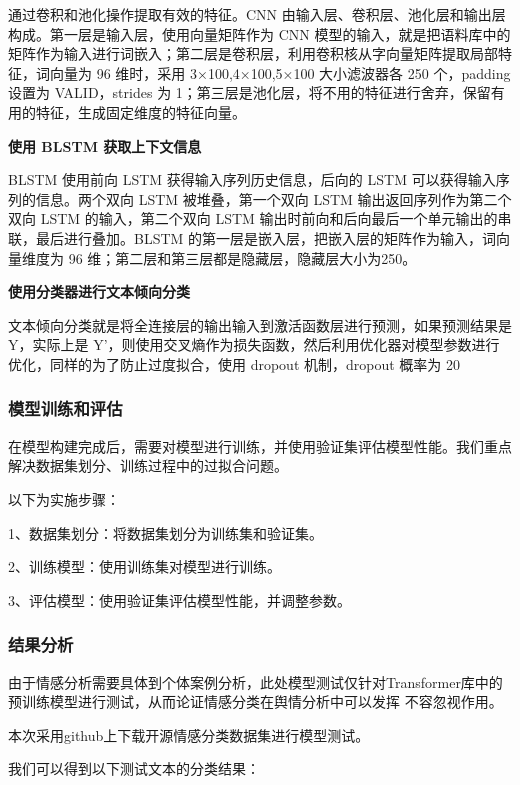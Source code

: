 \documentclass[UTF8,a4paper,15pt,titlepage,oneside]{ctexbook}
\begin{document}
通过卷积和池化操作提取有效的特征。CNN 由输入层、卷积层、池化层和输出层构成。第一层是输入层，使用向量矩阵作为 CNN 模型的输入，就是把语料库中的矩阵作为输入进行词嵌入；第二层是卷积层，利用卷积核从字向量矩阵提取局部特征，词向量为 96 维时，采用 3×100,4×100,5×100 大小滤波器各 250 个，padding 设置为 VALID，strides 为 1；第三层是池化层，将不用的特征进行舍弃，保留有用的特征，生成固定维度的特征向量。

\vskip 0.2cm
\noindent
\textbf{使用 BLSTM 获取上下文信息}

BLSTM 使用前向 LSTM 获得输入序列历史信息，后向的 LSTM 可以获得输入序列的信息。两个双向 LSTM 被堆叠，第一个双向 LSTM 输出返回序列作为第二个双向 LSTM 的输入，第二个双向 LSTM 输出时前向和后向最后一个单元输出的串联，最后进行叠加。BLSTM 的第一层是嵌入层，把嵌入层的矩阵作为输入，词向量维度为 96 维；第二层和第三层都是隐藏层，隐藏层大小为250。

\vskip 0.2cm
\noindent
\textbf{使用分类器进行文本倾向分类}

文本倾向分类就是将全连接层的输出输入到激活函数层进行预测，如果预测结果是 Y，实际上是 Y’，则使用交叉熵作为损失函数，然后利用优化器对模型参数进行优化，同样的为了防止过度拟合，使用 dropout 机制，dropout 概率为 20%

\subsubsection{模型训练和评估}

在模型构建完成后，需要对模型进行训练，并使用验证集评估模型性能。我们重点解决数据集划分、训练过程中的过拟合问题。

以下为实施步骤：

1、数据集划分：将数据集划分为训练集和验证集。

2、训练模型：使用训练集对模型进行训练。

3、评估模型：使用验证集评估模型性能，并调整参数。

\subsubsection{结果分析}

由于情感分析需要具体到个体案例分析，此处模型测试仅针对Transformer库中的预训练模型进行测试，从而论证情感分类在舆情分析中可以发挥
不容忽视作用。

本次采用github上下载开源情感分类数据集进行模型测试。



我们可以得到以下测试文本的分类结果：
\end{document}
